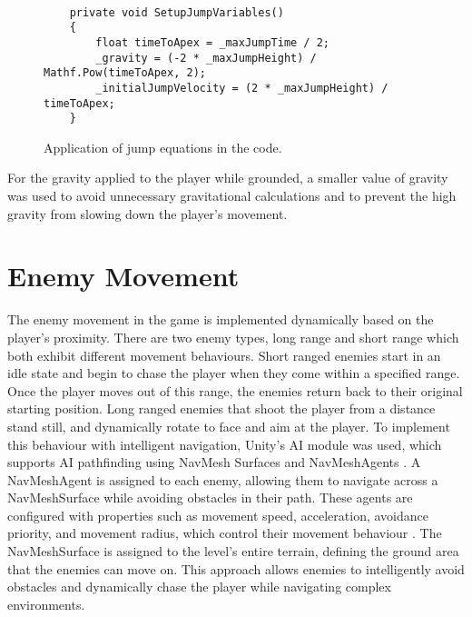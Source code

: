 \documentclass[10pt]{final_report}
\begin{document}
\paragraph{}
\begin{figure}[H]
	\begin{verbatim}
	private void SetupJumpVariables()
	{
	    float timeToApex = _maxJumpTime / 2;
	    _gravity = (-2 * _maxJumpHeight) / Mathf.Pow(timeToApex, 2);
	    _initialJumpVelocity = (2 * _maxJumpHeight) / timeToApex;
	}
	\end{verbatim}
	\caption{Application of jump equations in the code.}
\end{figure}
For the gravity applied to the player while grounded, a smaller value of gravity was used to avoid unnecessary gravitational calculations and to prevent the high gravity from slowing down the player's movement. \newline

\section{Enemy Movement}\label{enemy_movement}
The enemy movement in the game is implemented dynamically based on the player's proximity. There are two enemy types, long range and short range which both exhibit different movement behaviours. Short ranged enemies start in an idle state and begin to chase the player when they come within a specified range. Once the player moves out of this range, the enemies return back to their original starting position. Long ranged enemies that shoot the player from a distance stand still, and dynamically rotate to face and aim at the player. To implement this behaviour with intelligent navigation, Unity's AI module was used, which supports AI pathfinding using NavMesh Surfaces and NavMeshAgents \cite{unity2024_AI}. 
A NavMeshAgent is assigned to each enemy, allowing them to navigate across a NavMeshSurface while avoiding obstacles in their path. These agents are configured with properties such as movement speed, acceleration, avoidance priority, and movement radius, which control their movement behaviour \cite{unity2024_NavAgent}. The NavMeshSurface is assigned to the level's entire terrain, defining the ground area that the enemies can move on. This approach allows enemies to intelligently avoid obstacles and dynamically chase the player while navigating complex environments. \newline
\end{document}

